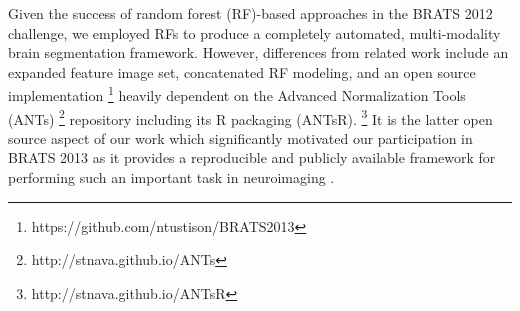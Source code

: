 
\author[label1]{Nicholas J. Tustison}
\author[label1]{Max Wintermark}
\author[label1]{Christopher R. Durst}
\author[label2]{Brian B. Avants}
\address[label1]{Department of Radiology and Medical Imaging, University of Virginia, Charlottesville, VA}
\address[label2]{Penn Image Computing and Science Lab, Department of Radiology, University of Pennsylvania, Philadelphia PA}

Given the success of random forest (RF)-based approaches in the BRATS 2012 
challenge, we employed RFs to produce a completely automated,
multi-modality brain segmentation framework.  However, differences from 
related work include an expanded feature image set, concatenated RF
modeling, and an open source implementation%
\footnote{
https://github.com/ntustison/BRATS2013
}
heavily dependent on the Advanced Normalization Tools (ANTs)%
\footnote{
http://stnava.github.io/ANTs
} repository including its R packaging (ANTsR).%
\footnote{
http://stnava.github.io/ANTsR
}
It is the latter open source aspect of our work which 
significantly motivated our participation in BRATS 2013 
as it provides a reproducible and publicly available framework 
for performing such an important task in neuroimaging 
\cite{ince2012}.



